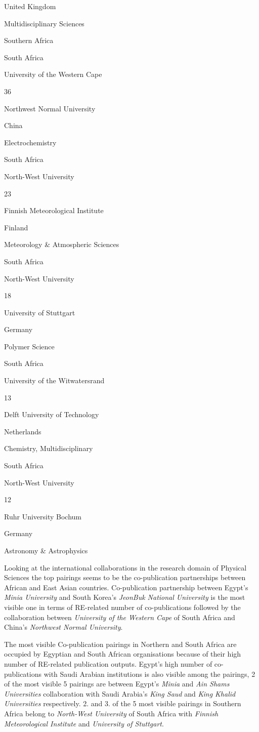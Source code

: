 \documentclass[12pt,twoside]{report}
\begin{document}
{United Kingdom}

{Multidisciplinary Sciences }

Southern Africa

{South Africa}

{University of the Western Cape }

{36}

{Northwest Normal University }

{China }

{Electrochemistry }

{South Africa}

{North-West University }

{23}

{Finnish Meteorological Institute}

{Finland }

{Meteorology \& Atmospheric Sciences }

{South Africa}

{North-West University }

{18}

{University of Stuttgart }

{Germany }

{Polymer Science }

{South Africa}

{University of the Witwatersrand }

{13}

{Delft University of Technology }

{Netherlands }

{Chemistry, Multidisciplinary }

{South Africa}

{North-West University }

{12}

{Ruhr University Bochum }

{Germany }

{Astronomy \& Astrophysics }

Looking at the international collaborations in the research domain of Physical Sciences the top pairings seems to be the co-publication partnerships between African and East Asian countries. Co-publication partnership between Egypt's \emph{Minia University} and South Korea's \emph{JeonBuk National University} is the most visible one in terms of RE-related number of co-publications followed by the collaboration between \emph{University of the Western Cape} of South Africa and China's \emph{Northwest Normal University}.

The most visible Co-publication pairings in Northern and South Africa are occupied by Egyptian and South African organisations because of their high number of RE-related publication outputs. Egypt's high number of co-publications with Saudi Arabian institutions is also visible among the pairings, 2 of the most visible 5 pairings are between Egypt's \emph{Minia} and \emph{Ain Shams Universities} collaboration with Saudi Arabia's \emph{King Saud} and \emph{King Khalid Universities} respectively. 2. and 3. of the 5 most visible pairings in Southern Africa belong to \emph{North-West University} of South Africa with \emph{Finnish Meteorological Institute} and \emph{University of Stuttgart}.
\end{document}
